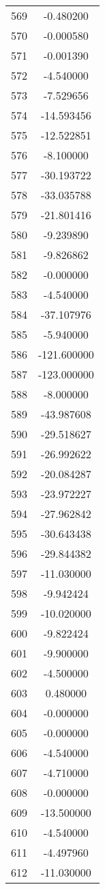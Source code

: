\documentclass[12pt]{article}
\begin{document}
\begin{longtable}{@{}cc@{}}
569 & -0.480200 \\
570 & -0.000580 \\
571 & -0.001390 \\
572 & -4.540000 \\
573 & -7.529656 \\
574 & -14.593456 \\
575 & -12.522851 \\
576 & -8.100000 \\
577 & -30.193722 \\
578 & -33.035788 \\
579 & -21.801416 \\
580 & -9.239890 \\
581 & -9.826862 \\
582 & -0.000000 \\
583 & -4.540000 \\
584 & -37.107976 \\
585 & -5.940000 \\
586 & -121.600000 \\
587 & -123.000000 \\
588 & -8.000000 \\
589 & -43.987608 \\
590 & -29.518627 \\
591 & -26.992622 \\
592 & -20.084287 \\
593 & -23.972227 \\
594 & -27.962842 \\
595 & -30.643438 \\
596 & -29.844382 \\
597 & -11.030000 \\
598 & -9.942424 \\
599 & -10.020000 \\
600 & -9.822424 \\
601 & -9.900000 \\
602 & -4.500000 \\
603 & 0.480000 \\
604 & -0.000000 \\
605 & -0.000000 \\
606 & -4.540000 \\
607 & -4.710000 \\
608 & -0.000000 \\
609 & -13.500000 \\
610 & -4.540000 \\
611 & -4.497960 \\
612 & -11.030000 \\

\end{longtable}
\end{document}
